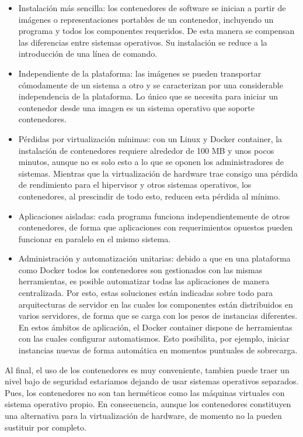 \documentclass[preprint,12pt]{elsarticle}
\begin{document}
\begin{itemize}
		\item Instalación más sencilla: los contenedores de software se inician a partir de imágenes o representaciones portables de un contenedor, incluyendo un programa y todos los componentes requeridos. De esta manera se compensan las diferencias entre sistemas operativos. Su instalación se reduce a la introducción de una línea de comando.
		\item Independiente de la plataforma: las imágenes se pueden transportar cómodamente de un sistema a otro y se caracterizan por una considerable independencia de la plataforma. Lo único que se necesita para iniciar un contenedor desde una imagen es un sistema operativo que soporte contenedores.
		\item Pérdidas por virtualización mínimas: con un Linux y Docker container, la instalación de contenedores requiere alrededor de 100 MB y unos pocos minutos, aunque no es solo esto a lo que se oponen los administradores de sistemas. Mientras que la virtualización de hardware trae consigo una pérdida de rendimiento para el hipervisor y otros sistemas operativos, los contenedores, al prescindir de todo esto, reducen esta pérdida al mínimo.
		\item Aplicaciones aisladas: cada programa funciona independientemente de otros contenedores, de forma que aplicaciones con requerimientos opuestos pueden funcionar en paralelo en el mismo sistema.
		\item Administración y automatización unitarias: debido a que en una plataforma como Docker todos los contenedores son gestionados con las mismas herramientas, es posible automatizar todas las aplicaciones de manera centralizada. Por esto, estas soluciones están indicadas sobre todo para arquitecturas de servidor en las cuales los componentes están distribuidos en varios servidores, de forma que se carga con los pesos de instancias diferentes. En estos ámbitos de aplicación, el Docker container dispone de herramientas con las cuales configurar automatismos. Esto posibilita, por ejemplo, iniciar instancias nuevas de forma automática en momentos puntuales de sobrecarga. \\
\end{itemize}
\par Al final, el uso de los contenedores es muy conveniente, tambien puede traer un nivel bajo de seguridad estariamos dejando de usar sistemas operativos separados. Pues, los contenedores no son tan herméticos como las máquinas virtuales con sistema operativo propio. En consecuencia, aunque los contenedores constituyen una alternativa para la virtualización de hardware, de momento no la pueden sustituir por completo.\\
\end{document}
